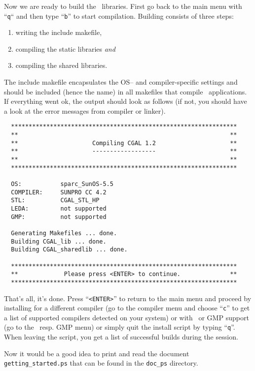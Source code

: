 Now we are ready to build the \cgal\ libraries.  First go back to the
main menu with ``\texttt{q}`` and then type ``{\tt b}'' to start
compilation. Building consists of three steps:
\begin{enumerate}
\item writing the include makefile,
\item compiling the static libraries \textit{and}
\item compiling the shared libraries.
\end{enumerate}
The include makefile encapsulates the OS-- and compiler-specific
settings and should be included (hence the name) in all makefiles that
compile \cgal\ applications. If everything went ok, the output should
look as follows (if not, you should have a look at the error messages
from compiler or linker).

{\scriptsize
\begin{verbatim}
  ****************************************************************
  **                                                            **
  **                     Compiling CGAL 1.2                     **
  **                     ------------------                     **
  **                                                            **
  ****************************************************************

  OS:           sparc_SunOS-5.5
  COMPILER:     SUNPRO CC 4.2
  STL:          CGAL_STL_HP
  LEDA:         not supported
  GMP:          not supported

  Generating Makefiles ... done.
  Building CGAL_lib ... done.
  Building CGAL_sharedlib ... done.

  ****************************************************************
  **             Please press <ENTER> to continue.              **
  ****************************************************************
\end{verbatim}}

That's all, it's done. Press ``\texttt{<ENTER>}'' to return to the main
menu and proceed by installing for a different compiler (go to the
compiler menu and choose ``\texttt{c}'' to get a list of supported
compilers detected on your system) or with \leda\ or GMP support (go
to the \leda\ resp.  GMP menu) or simply quit the install script by
typing ``\texttt{q}''. When leaving the script, you get a list of
successful builds during the session.

Now it would be a good idea to print and read the document
\texttt{getting\_started.ps} that can be found in the \texttt{doc\_ps}
directory.

